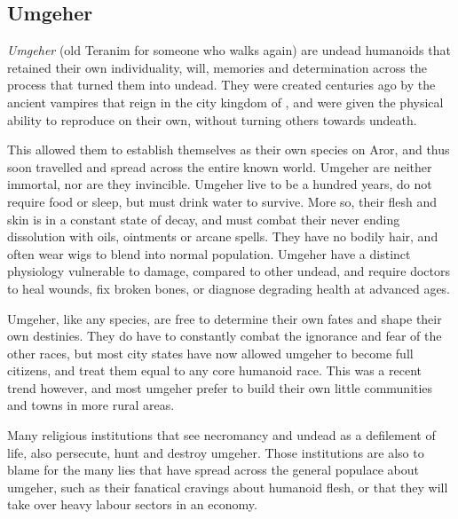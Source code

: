 \subsection{Umgeher}
\label{sec:Umgeher}



\emph{Umgeher} (old Teranim for someone who walks again) are undead humanoids
that retained their own individuality, will, memories and determination across
the process that turned them into undead. They were created centuries ago by
the ancient vampires that reign in the city kingdom of ,
and were given the physical ability to reproduce on their own, without turning
others towards undeath.

This allowed them to establish themselves as their own species on Aror, and
thus soon travelled and spread across the entire known world. Umgeher are
neither immortal, nor are they invincible. Umgeher live to be a hundred years,
do not require food or sleep, but must drink water to survive. More so, their
flesh and skin is in a constant state of decay, and must combat their never
ending dissolution with oils, ointments or arcane spells. They have no bodily
hair, and often wear wigs to blend into normal population. Umgeher have a
distinct physiology vulnerable to damage, compared to other undead, and
require doctors to heal wounds, fix broken bones, or diagnose degrading health
at advanced ages.

Umgeher, like any species, are free to determine their own fates and shape
their own destinies. They do have to constantly combat the ignorance and fear
of the other races, but most city states have now allowed umgeher to become
full citizens, and treat them equal to any core humanoid race. This was a
recent trend however, and most umgeher prefer to build their own little
communities and towns in more rural areas.

Many religious institutions that see necromancy and undead as a defilement of
life, also persecute, hunt and destroy umgeher. Those institutions are also
to blame for the many lies that have spread across the general populace about
umgeher, such as their fanatical cravings about humanoid flesh, or that they
will take over heavy labour sectors in an economy.

